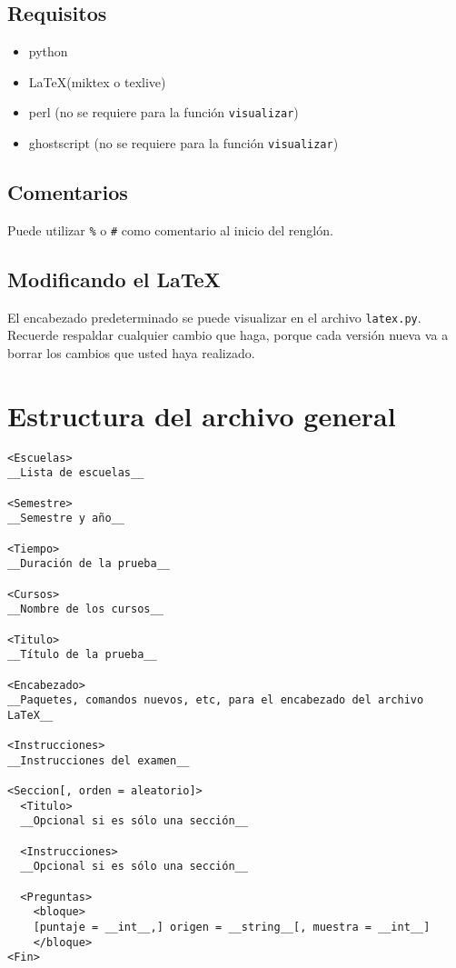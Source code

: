 \documentclass[12pt]{article}
\theoremstyle{definition}
\begin{document}
\subsection{Requisitos}
\begin{itemize}
  \item python
  \item \LaTeX (miktex o texlive)
  \item perl (no se requiere para la función \verb|visualizar|)
  \item ghostscript (no se requiere para la función \verb|visualizar|)
\end{itemize}

\subsection{Comentarios}
Puede utilizar \verb|%| o \verb|#| como comentario al inicio del renglón.

\subsection{Modificando el \LaTeX}
El encabezado predeterminado se puede visualizar en el archivo \verb|latex.py|. Recuerde respaldar cualquier cambio que haga, porque cada versión nueva va a borrar los cambios que usted haya realizado.

\section{Estructura del archivo general}
\small
\begin{verbatim}
<Escuelas>
__Lista de escuelas__

<Semestre>
__Semestre y año__

<Tiempo>
__Duración de la prueba__

<Cursos>
__Nombre de los cursos__

<Titulo>
__Título de la prueba__

<Encabezado>
__Paquetes, comandos nuevos, etc, para el encabezado del archivo LaTeX__

<Instrucciones>
__Instrucciones del examen__

<Seccion[, orden = aleatorio]>
  <Titulo>
  __Opcional si es sólo una sección__

  <Instrucciones>
  __Opcional si es sólo una sección__

  <Preguntas>
    <bloque>
    [puntaje = __int__,] origen = __string__[, muestra = __int__]
    </bloque>
<Fin>
\end{verbatim}
\normalsize
\end{document}
